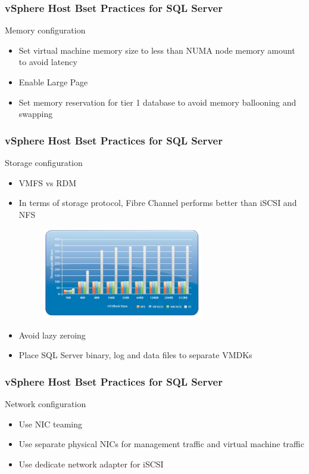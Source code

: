 \documentclass[CJK]{beamer}
\begin{document}
\begin{frame}[t]
    \frametitle{vSphere Host Bset Practices for SQL Server}
    Memory configuration
    \begin{itemize}
        \item Set virtual machine memory size to less than NUMA node memory amount to avoid latency
        \item Enable Large Page
        \item Set memory reservation for tier 1 database to avoid memory ballooning and swapping
    \end{itemize}
\end{frame}

\begin{frame}[t]
    \frametitle{vSphere Host Bset Practices for SQL Server}
    Storage configuration
    \begin{itemize}
        \item VMFS vs RDM
        \item In terms of storage protocol, Fibre Channel performs better than iSCSI and NFS
        \begin{figure}[b]
            \includegraphics[width=200pt]{"storage_protocol_compare.png"}
        \end{figure}
        \item Avoid lazy zeroing
        \item Place SQL Server binary, log and data files to separate VMDKs
    \end{itemize}
\end{frame}

\begin{frame}[t]
    \frametitle{vSphere Host Bset Practices for SQL Server}
    Network configuration
    \begin{itemize}
        \item Use NIC teaming
        \item Use separate physical NICs for management traffic and virtual machine traffic
        \item Use dedicate network adapter for iSCSI
    \end{itemize}
\end{frame}
\end{document}
